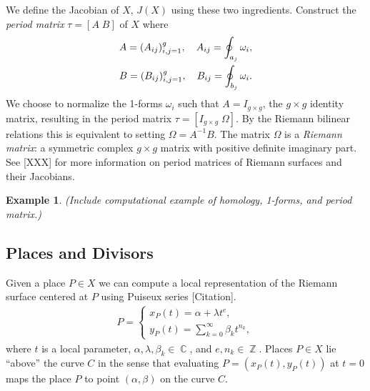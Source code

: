 \documentclass[12pt]{article}
\theoremstyle{definition}
\newtheorem{example}[theorem]{Example}
\DeclareMathOperator{\ZZ}{\mathbb{Z}}
\DeclareMathOperator{\CC}{\mathbb{C}}
\begin{document}
We define the Jacobian of $X$, $J(X)$ using these two
ingredients. Construct the {\it period matrix} $\tau = [A \; B]$ of $X$
where
\begin{gather} \label{eqn:periodmatrix}
  A = (A_{ij})_{i,j=1}^g, \quad A_{ij} = \oint_{a_j} \omega_i, \notag \\
  B = (B_{ij})_{i,j=1}^g, \quad B_{ij} = \oint_{b_j} \omega_i.
\end{gather}
We choose to normalize the 1-forms $\omega_i$ such that $A = I_{g \times
  g}$, the $g \times g$ identity matrix, resulting in the period matrix
$\tau = [I_{g \times g} \; \Omega]$. By the Riemann bilinear relations
this is equivalent to setting $\Omega = A^{-1}B$. The matrix $\Omega$ is
a {\it Riemann matrix}: a symmetric complex $g \times g$ matrix with
positive definite imaginary part. See [XXX] for more information on
period matrices of Riemann surfaces and their Jacobians.

\begin{example}
  {\it (Include computational example of homology, 1-forms, and period
    matrix.)}
\end{example}



\subsection{Places and Divisors}



Given a place $P \in X$ we can compute a local representation of the
Riemann surface centered at $P$ using Puiseux series [Citation].
\begin{align} \label{eqn:puiseux}
  P =
  \begin{cases}
    x_P(t) = \alpha + \lambda t^e, \\
    y_P(t) = \sum_{k=0}^\infty \beta_k t^{n_k},
  \end{cases}
\end{align}
where $t$ is a local parameter, $\alpha, \lambda, \beta_k \in \CC$, and
$e, n_k \in \ZZ$. Places $P \in X$ lie ``above'' the curve $C$ in the
sense that evaluating $P = (x_P(t), y_P(t))$ at $t=0$ maps the place $P$
to point $(\alpha,\beta)$ on the curve $C$.
\end{document}
